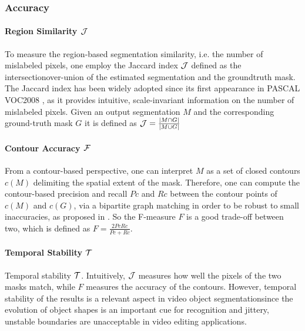 \subsubsection{Accuracy}
\paragraph{Region Similarity $\mathcal{J}$}
To measure the region-based segmentation similarity, i.e. the number of mislabeled pixels,
one employ the Jaccard index $\mathcal{J}$ defined as the intersectionover-union of the estimated segmentation and the groundtruth mask.
The Jaccard index has been widely adopted since its first appearance in PASCAL VOC2008 \cite{martin2004learning}, 
as it provides intuitive, scale-invariant information on the number of mislabeled pixels. Given an output segmentation $M$ and 
the corresponding ground-truth mask $G$ it is defined as $\mathcal{J} = \frac{|M \cap G|}{|M\cup G|}$

\paragraph{Contour Accuracy $\mathcal{F}$}
From a contour-based perspective, one can interpret $M$ as a set of closed contours $c(M)$
delimiting the spatial extent of the mask. Therefore, one
can compute the contour-based precision and recall $Pc$ and
$Rc$ between the contour points of $c(M)$ and $c(G)$, via a bipartite graph matching in order to be robust to small inaccuracies,
as proposed in \cite{martin2004learning}.
So the F-measure $F$ is a good trade-off between two, which is  defined as $F = \frac{2Pc Rc}{Pc+Rc}$.

\paragraph{Temporal Stability $\mathcal{T}$}
Temporal stability $\mathcal{T}$. Intuitively, $\mathcal{J}$ measures how well the pixels of the two masks match, while $F$ measures the
accuracy of the contours. However, temporal stability of the results is a relevant aspect in video object segmentationsince the evolution of object shapes is an important cue for
recognition and jittery, unstable boundaries are unacceptable in video editing applications. 



